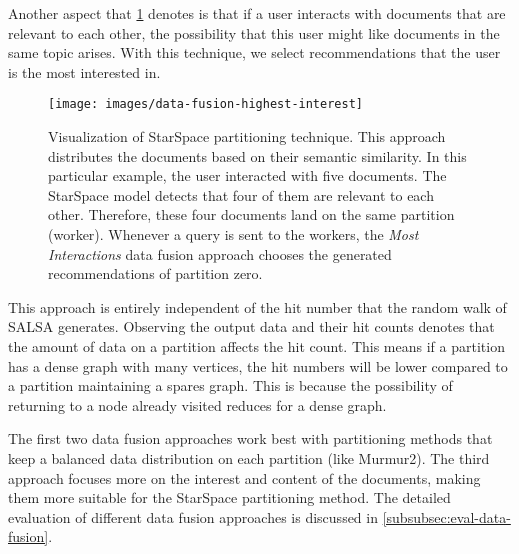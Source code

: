 Another aspect that \ref{fig:data-fusion-highest-ineterest} denotes is that if a user interacts with documents that are relevant to each other, the possibility that this user might like documents in the same topic arises. With this technique, we select recommendations that the user is the most interested in. 


\begin{figure}[!htb]
    \centering
    \texttt{[image: images/data-fusion-highest-interest]}
    \caption{Visualization of StarSpace partitioning technique. This approach distributes the documents based on their semantic similarity. In this particular example, the user interacted with five documents. The StarSpace model detects that four of them are relevant to each other. Therefore, these four documents land on the same partition (worker). Whenever a query is sent to the workers, the \emph{Most Interactions} data fusion approach chooses the generated recommendations of partition zero.}
    \label{fig:data-fusion-highest-ineterest}
\end{figure}


This approach is entirely independent of the hit number that the random walk of SALSA generates. Observing the output data and their hit counts denotes that the amount of data on a partition affects the hit count. This means if a partition has a dense graph with many vertices, the hit numbers will be lower compared to a partition maintaining a spares graph. This is because the possibility of returning to a node already visited reduces for a dense graph.


The first two data fusion approaches work best with partitioning methods that keep a balanced data distribution on each partition (like Murmur2). The third approach focuses more on the interest and content of the documents, making them more suitable for the StarSpace partitioning method. The detailed evaluation of different data fusion approaches is discussed in \ref{subsubsec:eval-data-fusion}.

